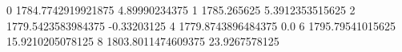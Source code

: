 0 1784.7742919921875 4.89990234375
1 1785.265625 5.3912353515625
2 1779.5423583984375 -0.33203125
4 1779.8743896484375 0.0
6 1795.79541015625 15.9210205078125
8 1803.8011474609375 23.9267578125
